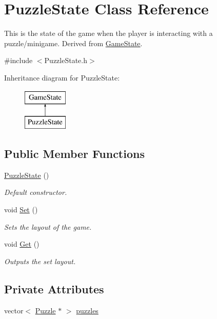 \hypertarget{classPuzzleState}{\section{Puzzle\-State Class Reference}
\label{classPuzzleState}
}


This is the state of the game when the player is interacting with a puzzle/minigame. Derived from \hyperlink{classGameState}{Game\-State}.  




{\ttfamily \#include $<$Puzzle\-State.\-h$>$}

Inheritance diagram for Puzzle\-State\-:\begin{figure}[H]
\begin{center}
\leavevmode
\includegraphics[height=2.000000cm]{classPuzzleState}
\end{center}
\end{figure}
\subsection*{Public Member Functions}
\begin{DoxyCompactItemize}
\item 
\hyperlink{classPuzzleState_a441deecdaf8b7ff103933664ff476870}{Puzzle\-State} ()
\begin{DoxyCompactList}\small\item\em Default constructor. \end{DoxyCompactList}\item 
void \hyperlink{classPuzzleState_a966b0f168ff5499f247c9ab519b524ab}{Set} ()
\begin{DoxyCompactList}\small\item\em Sets the layout of the game. \end{DoxyCompactList}\item 
void \hyperlink{classPuzzleState_ac9f6dd77d6471165d9eb2c18bd051dd1}{Get} ()
\begin{DoxyCompactList}\small\item\em Outputs the set layout. \end{DoxyCompactList}\end{DoxyCompactItemize}
\subsection*{Private Attributes}
\begin{DoxyCompactItemize}
\item 
vector$<$ \hyperlink{classPuzzle}{Puzzle} $\ast$ $>$ \hyperlink{classPuzzleState_a64782eeed96c532e9db6ed3e4ba6340e}{puzzles}
\end{DoxyCompactItemize}
